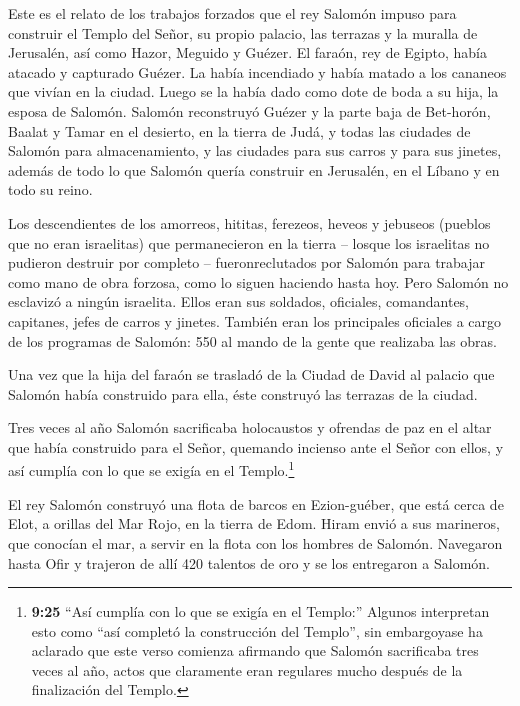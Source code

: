  Este es el relato de los trabajos forzados que el rey
Salomón impuso para construir el Templo del Señor, su propio palacio,
las terrazas y la muralla de Jerusalén, así como Hazor, Meguido y
Guézer.  El faraón, rey de Egipto, había atacado y
capturado Guézer. La había incendiado y había matado a los cananeos que
vivían en la ciudad. Luego se la había dado como dote de boda a su hija,
la esposa de Salomón.  Salomón reconstruyó Guézer y la
parte baja de Bet-horón,  Baalat y Tamar en el desierto, en
la tierra de Judá,  y todas las ciudades de Salomón para
almacenamiento, y las ciudades para sus carros y para sus jinetes,
además de todo lo que Salomón quería construir en Jerusalén, en el
Líbano y en todo su reino.

 Los descendientes de los amorreos, hititas, ferezeos,
heveos y jebuseos (pueblos que no eran israelitas)  que
permanecieron en la tierra -- losque los israelitas no pudieron destruir
por completo -- fueronreclutados por Salomón para trabajar como mano de
obra forzosa, como lo siguen haciendo hasta hoy.  Pero
Salomón no esclavizó a ningún israelita. Ellos eran sus soldados,
oficiales, comandantes, capitanes, jefes de carros y jinetes.
 También eran los principales oficiales a cargo de los
programas de Salomón: 550 al mando de la gente que realizaba las obras.

 Una vez que la hija del faraón se trasladó de la Ciudad de
David al palacio que Salomón había construido para ella, éste construyó
las terrazas de la ciudad.

 Tres veces al año Salomón sacrificaba holocaustos y
ofrendas de paz en el altar que había construido para el Señor, quemando
incienso ante el Señor con ellos, y así cumplía con lo que se exigía en
el Templo.\footnote{\textbf{9:25} ``Así cumplía con lo que se exigía en
  el Templo:'' Algunos interpretan esto como ``así completó la
  construcción del Templo'', sin embargoyase ha aclarado que este verso
  comienza afirmando que Salomón sacrificaba tres veces al año, actos
  que claramente eran regulares mucho después de la finalización del
  Templo.}

 El rey Salomón construyó una flota de barcos en
Ezion-guéber, que está cerca de Elot, a orillas del Mar Rojo, en la
tierra de Edom.  Hiram envió a sus marineros, que conocían
el mar, a servir en la flota con los hombres de Salomón. 
Navegaron hasta Ofir y trajeron de allí 420 talentos de oro y se los
entregaron a Salomón.

